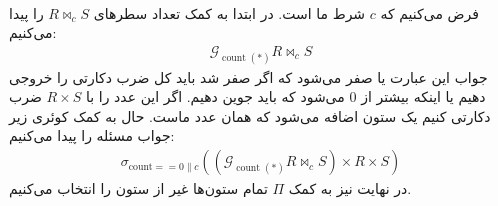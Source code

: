 \\
فرض می‌کنیم که
$c$
شرط
ما است.
در ابتدا به کمک
تعداد سطر‌های
$R \bowtie_c S$
را پیدا می‌کنیم:
\begin{gather*}
    \mathcal{G}_{\operatorname{count}(*)} R \bowtie_c S
\end{gather*}
جواب این عبارت یا صفر می‌شود که اگر صفر شد باید کل ضرب دکارتی را خروجی دهیم یا اینکه بیشتر از 0 می‌شود که
باید جوین دهیم. اگر این عدد را با
$R \times S$
ضرب دکارتی کنیم یک ستون اضافه می‌شود که همان عدد ماست.
حال به کمک کوئری زیر جواب مسئله را پیدا می‌کنیم:
\begin{gather*}
    \sigma_{\text{count} == 0 \|c} ((\mathcal{G}_{\operatorname{count}(*)} R \bowtie_c S) \times R \times S)
\end{gather*}
در نهایت نیز به کمک
$\Pi$
تمام ستون‌ها غیر از ستون
را انتخاب می‌کنیم.




